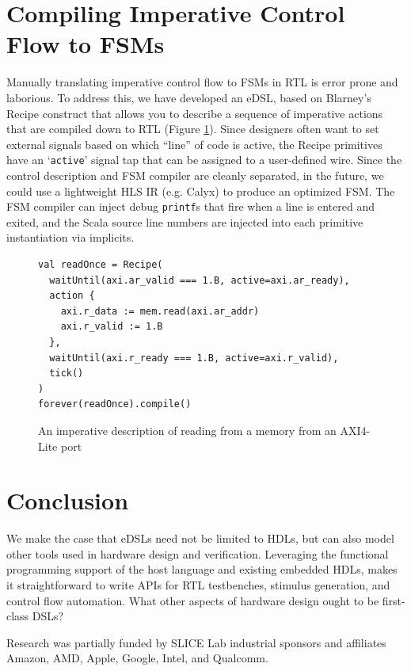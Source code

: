 \documentclass[sigplan,review,nonacm,9pt]{acmart}
\begin{document}
\section{Compiling Imperative Control Flow to FSMs}

Manually translating imperative control flow to FSMs in RTL is error prone and laborious.
To address this, we have developed an eDSL\cite{chisel_recipes}, based on Blarney's Recipe construct\cite{blarney} that allows you to describe a sequence of imperative actions that are compiled down to RTL (Figure \ref{fig:recipes}).
Since designers often want to set external signals based on which ``line'' of code is active, the Recipe primitives have an `\texttt{active}' signal tap that can be assigned to a user-defined wire.
Since the control description and FSM compiler are cleanly separated, in the future, we could use a lightweight HLS IR (e.g. Calyx\cite{calyx}) to produce an optimized FSM.
The FSM compiler can inject debug \texttt{printf}s that fire when a line is entered and exited, and the Scala source line numbers are injected into each primitive instantiation via implicits\cite{sourcecode}.

\begin{figure}
\begin{verbatim}
val readOnce = Recipe(
  waitUntil(axi.ar_valid === 1.B, active=axi.ar_ready),
  action {
    axi.r_data := mem.read(axi.ar_addr)
    axi.r_valid := 1.B
  },
  waitUntil(axi.r_ready === 1.B, active=axi.r_valid),
  tick()
)
forever(readOnce).compile()
\end{verbatim}
\caption{An imperative description of reading from a memory from an AXI4-Lite port}
\label{fig:recipes}
\end{figure}

\section{Conclusion}

We make the case that eDSLs need not be limited to HDLs, but can also model other tools used in hardware design and verification.
Leveraging the functional programming support of the host language and existing embedded HDLs, makes it straightforward to write APIs for RTL testbenches, stimulus generation, and control flow automation.
What other aspects of hardware design ought to be first-class DSLs?

\begin{acks}
Research was partially funded by SLICE Lab industrial sponsors and affiliates Amazon, AMD, Apple, Google, Intel, and Qualcomm.
\end{acks}




\end{document}
